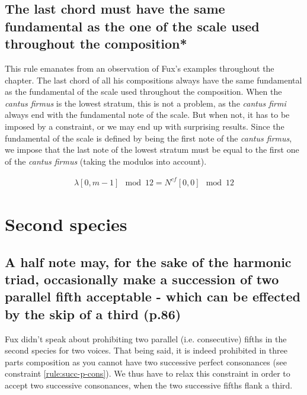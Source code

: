 \subsection{\reddot The last chord must have the same fundamental as the one of the scale used throughout the composition*}
This rule emanates from an observation of Fux's examples throughout the chapter. The last chord of all his compositions always have the same fundamental as the fundamental of the scale used throughout the composition.
When the \textit{cantus firmus} is the lowest stratum, this is not a problem, as the \textit{cantus firmi} always end with the fundamental note of the scale. But when not, it has to be imposed by a constraint, or we may end up with surprising results. Since the fundamental of the scale is defined by being the first note of the \textit{cantus firmus}, we impose that the last note of the lowest stratum must be equal to the first one of the \textit{cantus firmus} (taking the modulos into account).


\begin{equation} \begin{aligned}
\lambda[0, m-1] \mod 12 = N^{cf}[0, 0] \mod 12
\end{aligned} \end{equation}



\section{Second species}
\subsection{A half note may, for the sake of the harmonic triad, occasionally make a succession of two parallel fifth acceptable - which can be effected by the skip of a third (p.86)}
Fux didn't speak about prohibiting two parallel (i.e. consecutive) fifths in the second species for two voices. That being said, it is indeed prohibited in three parts composition as you cannot have two successive perfect consonances (see constraint \ref{rule:succ-p-cons}). We thus have to relax this constraint in order to accept two successive consonances, when the two successive fifths flank a third.


